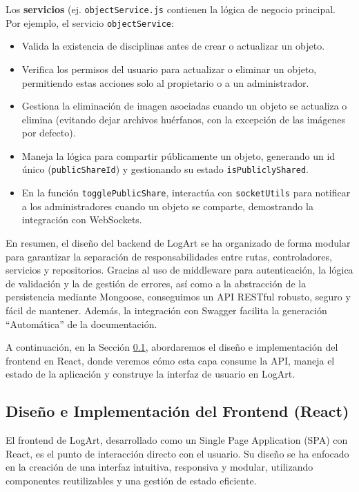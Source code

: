 Los \textbf{servicios} (ej. \texttt{objectService.js} contienen la lógica de negocio principal. Por ejemplo, el servicio \texttt{objectService}:
\begin{itemize}
    \item Valida la existencia de disciplinas antes de crear o actualizar un objeto.
    \item Verifica los permisos del usuario para actualizar o eliminar un objeto, permitiendo estas acciones solo al propietario o a un administrador.
    \item Gestiona la eliminación de imagen asociadas cuando un objeto se actualiza o elimina (evitando dejar archivos huérfanos, con la excepción de las imágenes por defecto).
    \item Maneja la lógica para compartir públicamente un objeto, generando un id único (\texttt{publicShareId}) y gestionando su estado \texttt{isPubliclyShared}.
    \item En la función \texttt{togglePublicShare}, interactúa con \texttt{socketUtils} para notificar a los administradores cuando un objeto se comparte, demostrando la integración con WebSockets.
\end{itemize}

En resumen, el diseño del backend de LogArt se ha organizado de forma modular para garantizar la separación de responsabilidades entre rutas, controladores, servicios y repositorios. Gracias al uso de middleware para autenticación, la lógica de validación y la de gestión de errores, así como a la abstracción de la persistencia mediante Mongoose, conseguimos un API RESTful robusto, seguro y fácil de mantener. Además, la integración con Swagger facilita la generación ``Automática'' de la documentación.

A continuación, en la Sección \ref{ssec:disenoImplFrontend}, abordaremos el diseño e implementación del frontend en React, donde veremos cómo esta capa consume la API, maneja el estado de la aplicación y construye la interfaz de usuario en LogArt.

\subsection{Diseño e Implementación del Frontend (React)}
\label{ssec:disenoImplFrontend}

El frontend de LogArt, desarrollado como un Single Page Application (SPA) con React, es el punto de interacción directo con el usuario. Su diseño se ha enfocado en la creación de una interfaz intuitiva, responsiva y modular, utilizando componentes reutilizables y una gestión de estado eficiente.

